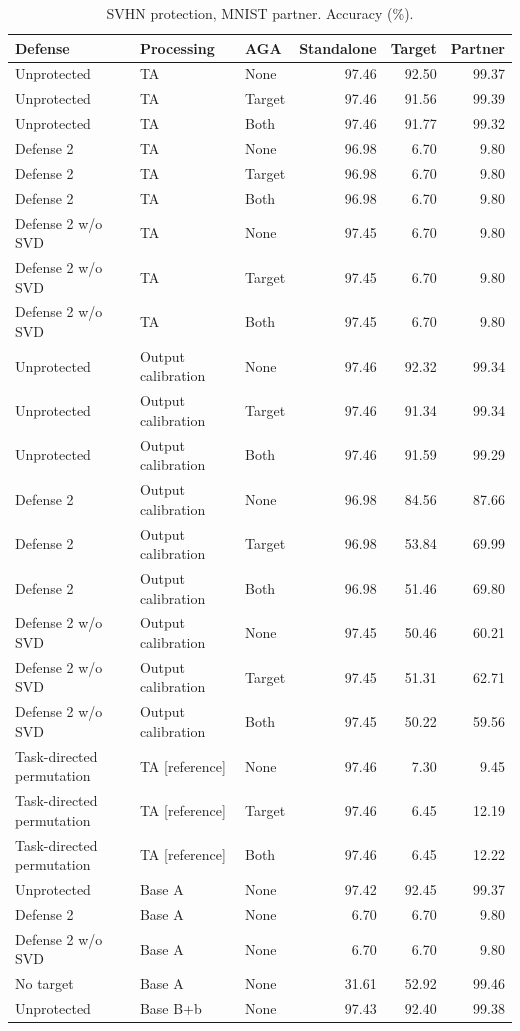 \begin{table}[t]
\centering\small
\caption{SVHN protection, MNIST partner. Accuracy (\%).}
\begin{tabular}{lllrrr}
\toprule
Defense & Processing & AGA & Standalone & Target & Partner \\
\midrule
Unprotected & TA & None & 97.46 & 92.50 & 99.37 \\
Unprotected & TA & Target & 97.46 & 91.56 & 99.39 \\
Unprotected & TA & Both & 97.46 & 91.77 & 99.32 \\
Defense 2 & TA & None & 96.98 & 6.70 & 9.80 \\
Defense 2 & TA & Target & 96.98 & 6.70 & 9.80 \\
Defense 2 & TA & Both & 96.98 & 6.70 & 9.80 \\
Defense 2 w/o SVD & TA & None & 97.45 & 6.70 & 9.80 \\
Defense 2 w/o SVD & TA & Target & 97.45 & 6.70 & 9.80 \\
Defense 2 w/o SVD & TA & Both & 97.45 & 6.70 & 9.80 \\
Unprotected & Output calibration & None & 97.46 & 92.32 & 99.34 \\
Unprotected & Output calibration & Target & 97.46 & 91.34 & 99.34 \\
Unprotected & Output calibration & Both & 97.46 & 91.59 & 99.29 \\
Defense 2 & Output calibration & None & 96.98 & 84.56 & 87.66 \\
Defense 2 & Output calibration & Target & 96.98 & 53.84 & 69.99 \\
Defense 2 & Output calibration & Both & 96.98 & 51.46 & 69.80 \\
Defense 2 w/o SVD & Output calibration & None & 97.45 & 50.46 & 60.21 \\
Defense 2 w/o SVD & Output calibration & Target & 97.45 & 51.31 & 62.71 \\
Defense 2 w/o SVD & Output calibration & Both & 97.45 & 50.22 & 59.56 \\
Task-directed permutation & TA [reference] & None & 97.46 & 7.30 & 9.45 \\
Task-directed permutation & TA [reference] & Target & 97.46 & 6.45 & 12.19 \\
Task-directed permutation & TA [reference] & Both & 97.46 & 6.45 & 12.22 \\
Unprotected & Base A & None & 97.42 & 92.45 & 99.37 \\
Defense 2 & Base A & None & 6.70 & 6.70 & 9.80 \\
Defense 2 w/o SVD & Base A & None & 6.70 & 6.70 & 9.80 \\
No target & Base A & None & 31.61 & 52.92 & 99.46 \\
Unprotected & Base B+b & None & 97.43 & 92.40 & 99.38 \\
\bottomrule
\end{tabular}
\end{table}

